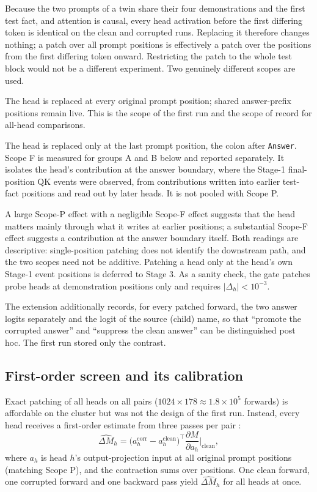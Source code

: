 Because the two prompts of a twin share their four demonstrations and the first test fact, and attention is causal, every head activation before the first differing token is identical on the clean and corrupted runs. Replacing it therefore changes nothing; a patch over all prompt positions is effectively a patch over the positions from the first differing token onward. Restricting the patch to the whole test block would not be a different experiment. Two genuinely different scopes are used.
\begin{description}[itemsep=1pt,leftmargin=1.6cm]
\item[Scope P (all prompt positions).] The head is replaced at every original prompt position; shared answer-prefix positions remain live. This is the scope of the first run and the scope of record for all-head comparisons.
\item[Scope F (final position only).] The head is replaced only at the last prompt position, the colon after \texttt{Answer}. Scope F is measured for groups A and B below and reported separately. It isolates the head's contribution at the answer boundary, where the Stage-1 final-position QK events were observed, from contributions written into earlier test-fact positions and read out by later heads. It is not pooled with Scope P.
\end{description}
A large Scope-P effect with a negligible Scope-F effect suggests that the head matters mainly through what it writes at earlier positions; a substantial Scope-F effect suggests a contribution at the answer boundary itself. Both readings are descriptive: single-position patching does not identify the downstream path, and the two scopes need not be additive. Patching a head only at the head's own Stage-1 event positions is deferred to Stage 3. As a sanity check, the gate patches probe heads at demonstration positions only and requires $|\Delta_h|<10^{-3}$.

The extension additionally records, for every patched forward, the two answer logits separately and the logit of the source (child) name, so that ``promote the corrupted answer'' and ``suppress the clean answer'' can be distinguished post hoc. The first run stored only the contrast.

\subsection{First-order screen and its calibration}
Exact patching of all heads on all pairs ($1024\times178\approx1.8\times10^{5}$ forwards) is affordable on the cluster but was not the design of the first run. Instead, every head receives a first-order estimate from three passes per pair \cite{attrpatch}:
\begin{equation}
\widehat{\Delta M}_h=\big(a_h^{\text{corr}}-a_h^{\text{clean}}\big)^{\!\top}\frac{\partial M}{\partial a_h}\bigg|_{\text{clean}},
\end{equation}
where $a_h$ is head $h$'s output-projection input at all original prompt positions (matching Scope P), and the contraction sums over positions. One clean forward, one corrupted forward and one backward pass yield $\widehat{\Delta M}_h$ for all heads at once.


